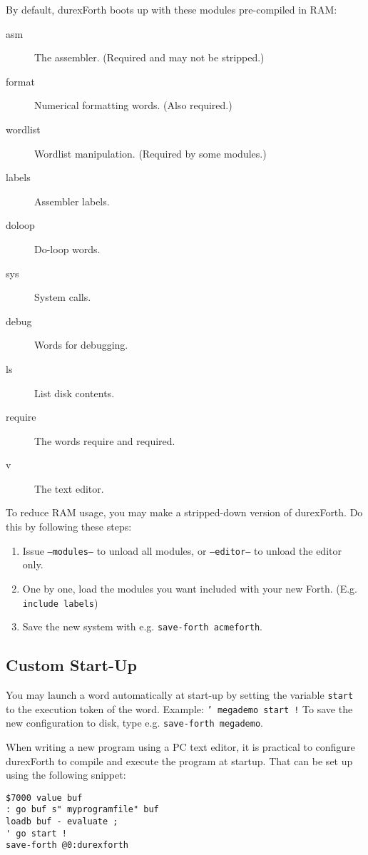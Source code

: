 By default, durexForth boots up with these modules pre-compiled in RAM:

\begin{description}
    \item[asm] The assembler. (Required and may not be stripped.)
    \item[format] Numerical formatting words. (Also required.)
    \item[wordlist] Wordlist manipulation. (Required by some modules.)
    \item[labels] Assembler labels.
    \item[doloop] Do-loop words.
    \item[sys] System calls.
    \item[debug] Words for debugging.
    \item[ls] List disk contents.
    \item[require] The words require and required.
    \item[v] The text editor.
\end{description}

To reduce RAM usage, you may make a stripped-down version of durexForth. Do
this by following these steps:

\begin{enumerate}
\item Issue \texttt{---modules---} to unload all modules, or \texttt{---editor---} to unload the editor only.
\item One by one, load the modules you want included with your new Forth. (E.g. \texttt{include labels})
\item Save the new system with e.g. \texttt{save-forth acmeforth}.
\end{enumerate}

\subsection{Custom Start-Up}

You may launch a word automatically at start-up by setting the variable
\texttt{start} to the execution token of the word. Example: \texttt{'
megademo start !} To save the new configuration to disk, type e.g.
\texttt{save-forth megademo}.

When writing a new program using a PC text editor, it is practical to
configure durexForth to compile and execute the program at startup. That
can be set up using the following snippet:

\begin{verbatim}
$7000 value buf
: go buf s" myprogramfile" buf
loadb buf - evaluate ;
' go start !
save-forth @0:durexforth
\end{verbatim}

